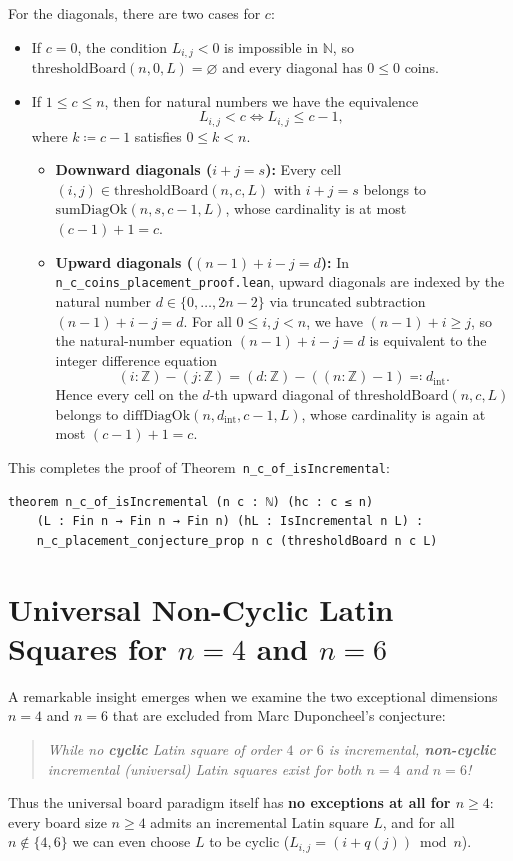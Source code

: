\documentclass[11pt,a4paper]{article}
\theoremstyle{remark}
\begin{document}
For the diagonals, there are two cases for $c$:
\begin{itemize}[nosep]
  \item If $c = 0$, the condition $L_{i,j} < 0$ is impossible in $\mathbb{N}$, so $\mathrm{thresholdBoard}(n, 0, L) = \varnothing$ and every diagonal has $0 \le 0$ coins.
  \item If $1 \le c \le n$, then for natural numbers we have the equivalence
  \[
    L_{i,j} < c \iff L_{i,j} \le c - 1,
  \]
  where $k \coloneqq c - 1$ satisfies $0 \le k < n$.
  \begin{itemize}[nosep]
    \item \textbf{Downward diagonals ($i + j = s$):} Every cell $(i, j) \in \mathrm{thresholdBoard}(n, c, L)$ with $i + j = s$ belongs to $\mathrm{sumDiagOk}(n, s, c - 1, L)$, whose cardinality is at most $(c - 1) + 1 = c$.
    \item \textbf{Upward diagonals ($(n - 1) + i - j = d$):} In \texttt{n\_c\_coins\_placement\_proof.lean}, upward diagonals are indexed by the natural number $d \in \{0, \dots, 2n - 2\}$ via truncated subtraction $(n - 1) + i - j = d$. For all $0 \le i, j < n$, we have $(n - 1) + i \ge j$, so the natural-number equation $(n - 1) + i - j = d$ is equivalent to the integer difference equation
    \[
      (i : \mathbb{Z}) - (j : \mathbb{Z}) = (d : \mathbb{Z}) - ((n : \mathbb{Z}) - 1) \eqqcolon d_{\mathrm{int}}.
    \]
    Hence every cell on the $d$-th upward diagonal of $\mathrm{thresholdBoard}(n, c, L)$ belongs to $\mathrm{diffDiagOk}(n, d_{\mathrm{int}}, c - 1, L)$, whose cardinality is again at most $(c - 1) + 1 = c$.
  \end{itemize}
\end{itemize}

This completes the proof of Theorem~\texttt{n\_c\_of\_isIncremental}:
\begin{lstlisting}[language=Lean4]
theorem n_c_of_isIncremental (n c : ℕ) (hc : c ≤ n)
    (L : Fin n → Fin n → Fin n) (hL : IsIncremental n L) :
    n_c_placement_conjecture_prop n c (thresholdBoard n c L)
\end{lstlisting}

\section{Universal Non-Cyclic Latin Squares for \texorpdfstring{$n = 4$}{n = 4} and \texorpdfstring{$n = 6$}{n = 6}}

A remarkable insight emerges when we examine the two exceptional dimensions $n = 4$ and $n = 6$ that are excluded from Marc Duponcheel's conjecture:
\begin{quote}
\emph{While no \textbf{cyclic} Latin square of order $4$ or $6$ is incremental, \textbf{non-cyclic} incremental (universal) Latin squares exist for both $n = 4$ and $n = 6$!}
\end{quote}
Thus the universal board paradigm itself has \textbf{no exceptions at all for $n \ge 4$}: every board size $n \ge 4$ admits an incremental Latin square $L$, and for all $n \notin \{4, 6\}$ we can even choose $L$ to be cyclic ($L_{i,j} = (i + q(j)) \bmod n$).
\end{document}
